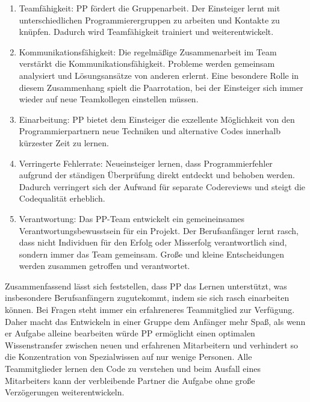 \begin{enumerate}[i]


\item Teamfähigkeit: PP fördert die Gruppenarbeit. Der Einsteiger lernt mit unterschiedlichen Programmierergruppen zu arbeiten und Kontakte zu knüpfen. Dadurch wird Teamfähigkeit trainiert und weiterentwickelt.

\item Kommunikationsfähigkeit: Die regelmäßige Zusammenarbeit im Team verstärkt die Kommunikationsfähigkeit.  Probleme werden gemeinsam analysiert und Lösungsansätze von anderen erlernt. Eine besondere Rolle in diesem Zusammenhang spielt die Paarrotation, bei der Einsteiger sich immer wieder auf neue Teamkollegen einstellen müssen.

\item Einarbeitung: PP bietet dem Einsteiger die exzellente Möglichkeit von den Programmierpartnern neue Techniken und alternative Codes innerhalb kürzester Zeit zu lernen.

\item Verringerte Fehlerrate: Neueinsteiger lernen, dass Programmierfehler aufgrund der ständigen Überprüfung direkt entdeckt und behoben werden. Dadurch verringert sich der Aufwand für separate Codereviews und steigt die Codequalität erheblich.

\item Verantwortung: Das PP-Team entwickelt ein gemeineinsames Verantwortungsbewusstsein für ein Projekt. Der Berufsanfänger lernt rasch, dass nicht Individuen für den Erfolg oder Misserfolg verantwortlich sind, sondern immer das Team gemeinsam. Große und kleine Entscheidungen werden zusammen getroffen und verantwortet.

\end{enumerate}

Zusammenfassend lässt sich feststellen, dass PP das Lernen unterstützt, was insbesondere Berufsanfängern zugutekommt, indem sie sich rasch einarbeiten können. Bei Fragen steht immer ein erfahreneres Teammitglied zur Verfügung. Daher macht das Entwickeln in einer Gruppe dem Anfänger mehr Spaß, als wenn er Aufgabe alleine bearbeiten würde PP ermöglicht einen optimalen Wissenstransfer zwischen neuen und erfahrenen Mitarbeitern und verhindert so die Konzentration von Spezialwissen auf nur wenige Personen. Alle Teammitglieder lernen den Code zu verstehen und beim Ausfall eines Mitarbeiters kann der verbleibende Partner die Aufgabe ohne große Verzögerungen weiterentwickeln.
